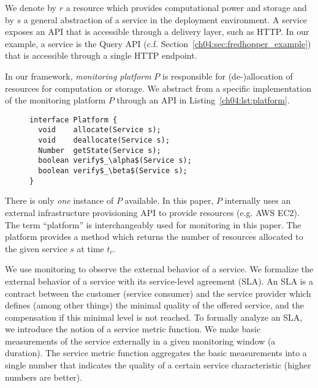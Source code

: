 We denote by $r$ a resource which provides computational power and storage
and by $s$ a general abstraction of a service in the deployment environment. 
A service exposes an API that is accessible through a delivery layer, such as HTTP.
In our example, a service is the Query API (c.f. Section~\ref{ch04:sec:fredhopper_example}) that is accessible through a single HTTP endpoint.

In our framework, 
\emph{monitoring platform}  $P$ is responsible for (de-)allocation of resources for computation or storage.
We abstract from a specific implementation of the monitoring platform $P$ through an API in Listing~\ref{ch04:lst:platform}. 
% 

\lstset{language=java}
\begin{figure}[h]
\begin{center}
\begin{lstlisting}[mathescape,caption=Platform API,label=ch04:lst:platform]
interface Platform {
  void    allocate(Service s);
  void    deallocate(Service s);
  Number  getState(Service s);
  boolean verify$_\alpha$(Service s);
  boolean verify$_\beta$(Service s);
}
\end{lstlisting}
\end{center}   
\end{figure}
\lstset{mathescape=false}
% 

There is only \emph{one} instance of $P$ available.
In this paper, $P$ internally uses an external infrastructure provisioning API to provide resources (e.g. AWS EC2).
The term ``platform'' is interchangeably used for monitoring in this paper.
The platform provides a method  which returns
the number of resources allocated to the given service $s$ at time $t_c$.

We use monitoring to observe the external behavior of a service.
We formalize the external behavior of a service with its service-level agreement (SLA).
An SLA is a contract between the customer (service consumer) and the service provider
which defines (among other things) the minimal quality of the offered service,
and the compensation if this minimal level is not reached.
To formally analyze an SLA, we introduce the notion of a service metric function.
We make basic measurements of the service externally in a given monitoring window (a duration).
The service metric function aggregates the basic measurements into a single number
that indicates the quality of a certain service characteristic (higher numbers are better).
%

